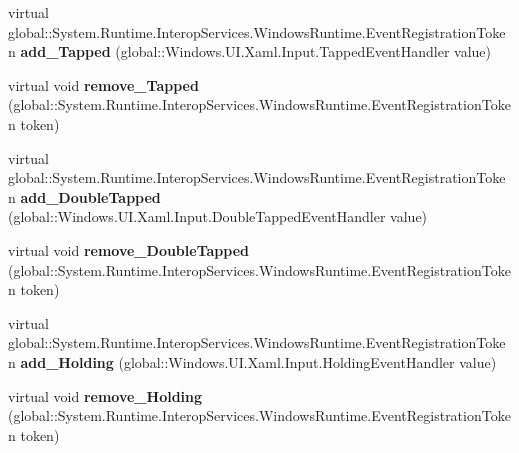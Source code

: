 \begin{DoxyCompactItemize}
\item 
\mbox{\label{class_windows_1_1_u_i_1_1_xaml_1_1_u_i_element_a424707fb793f3cb0d3d9c1a1d642c7e1}} 
virtual global\+::\+System.\+Runtime.\+Interop\+Services.\+Windows\+Runtime.\+Event\+Registration\+Token {\bfseries add\+\_\+\+Tapped} (global\+::\+Windows.\+U\+I.\+Xaml.\+Input.\+Tapped\+Event\+Handler value)
\item 
\mbox{\label{class_windows_1_1_u_i_1_1_xaml_1_1_u_i_element_a2e2bb189943aceb74962211a295014c7}} 
virtual void {\bfseries remove\+\_\+\+Tapped} (global\+::\+System.\+Runtime.\+Interop\+Services.\+Windows\+Runtime.\+Event\+Registration\+Token token)
\item 
\mbox{\label{class_windows_1_1_u_i_1_1_xaml_1_1_u_i_element_a5dae62e559d69ce1b422ccd06618f671}} 
virtual global\+::\+System.\+Runtime.\+Interop\+Services.\+Windows\+Runtime.\+Event\+Registration\+Token {\bfseries add\+\_\+\+Double\+Tapped} (global\+::\+Windows.\+U\+I.\+Xaml.\+Input.\+Double\+Tapped\+Event\+Handler value)
\item 
\mbox{\label{class_windows_1_1_u_i_1_1_xaml_1_1_u_i_element_a943e8ea205e8d92b950867b58c4406d7}} 
virtual void {\bfseries remove\+\_\+\+Double\+Tapped} (global\+::\+System.\+Runtime.\+Interop\+Services.\+Windows\+Runtime.\+Event\+Registration\+Token token)
\item 
\mbox{\label{class_windows_1_1_u_i_1_1_xaml_1_1_u_i_element_a4bbe62d6b5ea9aa8d3c4d53f196cc796}} 
virtual global\+::\+System.\+Runtime.\+Interop\+Services.\+Windows\+Runtime.\+Event\+Registration\+Token {\bfseries add\+\_\+\+Holding} (global\+::\+Windows.\+U\+I.\+Xaml.\+Input.\+Holding\+Event\+Handler value)
\item 
\mbox{\label{class_windows_1_1_u_i_1_1_xaml_1_1_u_i_element_a1cb283d7dedbabf394dd0cd9a384d808}} 
virtual void {\bfseries remove\+\_\+\+Holding} (global\+::\+System.\+Runtime.\+Interop\+Services.\+Windows\+Runtime.\+Event\+Registration\+Token token)
\item 
\mbox{\label{class_windows_1_1_u_i_1_1_xaml_1_1_u_i_element_a2013f410a096b8dec9f149c57069520c}} 

\end{DoxyCompactItemize}

